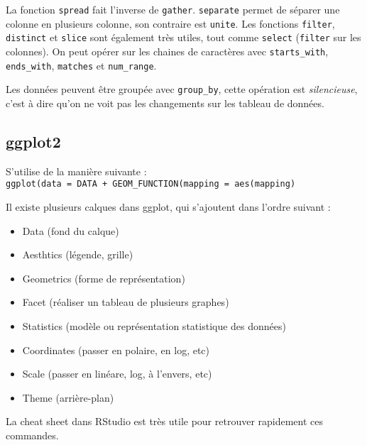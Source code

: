 \documentclass{article}
\begin{document}
La fonction \texttt{spread} fait l'inverse de \texttt{gather}. \texttt{separate} permet de séparer une colonne en plusieurs colonne, son contraire est \texttt{unite}. Les fonctions \texttt{filter}, \texttt{distinct} et \texttt{slice} sont également très utiles, tout comme \texttt{select} (\texttt{filter} sur les colonnes). On peut opérer sur les chaines de caractères avec \texttt{starts\_with}, \texttt{ends\_with}, \texttt{matches} et \texttt{num\_range}.

Les données peuvent être groupée avec \texttt{group\_by}, cette opération est \emph{silencieuse}, c'est à dire qu'on ne voit pas les changements sur les tableau de données.

\subsection{ggplot2}
S'utilise de la manière suivante :\\
\texttt{ggplot(data = DATA + GEOM\_FUNCTION(mapping = aes(mapping)}

Il existe plusieurs calques dans ggplot, qui s'ajoutent dans l'ordre suivant :
\begin{itemize}
\item Data (fond du calque)
\item Aesthtics (légende, grille)
\item Geometrics (forme de représentation)
\item Facet (réaliser un tableau de plusieurs graphes)
\item Statistics (modèle ou représentation statistique des données)
\item Coordinates (passer en polaire, en log, etc)
\item Scale (passer en linéare, log, à l'envers, etc)
\item Theme (arrière-plan)
\end{itemize}

La cheat sheet dans RStudio est très utile pour retrouver rapidement ces commandes.
\end{document}
